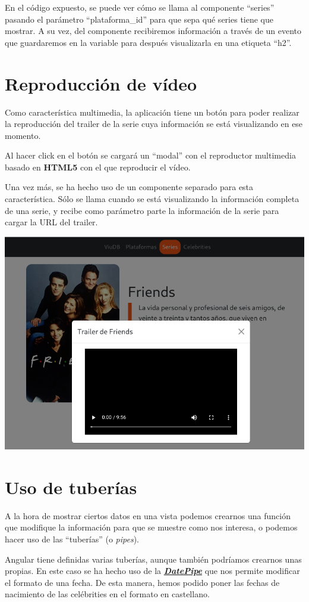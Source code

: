 \documentclass{\ClassPath/viu-tfm-template}
\begin{document}
En el código expuesto, se puede ver cómo se llama al componente “series” pasando el parámetro “plataforma\_id” para que sepa qué series tiene que mostrar. A su vez, del componente recibiremos información a través de un evento que guardaremos en la variable  para después visualizarla en una etiqueta “h2”.


\section{Reproducción de vídeo}

Como característica multimedia, la aplicación tiene un botón para poder realizar la reproducción del trailer de la serie cuya información se está visualizando en ese momento.

Al hacer click en el botón se cargará un “modal” con el reproductor multimedia basado en \textbf{HTML5} con el que reproducir el vídeo.

Una vez más, se ha hecho uso de un componente separado para esta característica. Sólo se llama cuando se está visualizando la información completa de una serie, y recibe como parámetro parte la información de la serie para cargar la URL del trailer.


\begin{center}
    \includegraphics[frame,width=0.7\linewidth]{img/video.png}
\end{center}


\section{Uso de tuberías}
A la hora de mostrar ciertos datos en una vista podemos crearnos una función que modifique la información para que se muestre como nos interesa, o podemos hacer uso de las “tuberías” (o \textit{pipes}).

Angular tiene definidas varias tuberías, aunque también podríamos crearnos unas propias. En este caso se ha hecho uso de la \textit{\textbf{\href{https://angular.io/api/common/DatePipe}{DatePipe}}} que nos permite modificar el formato de una fecha. De esta manera, hemos podido poner las fechas de nacimiento de las celébrities en el formato en castellano.
\end{document}
